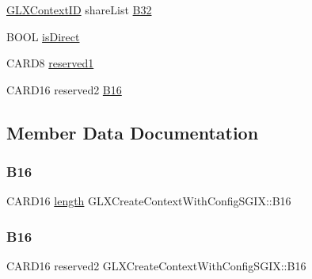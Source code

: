 \begin{DoxyCompactItemize}
\hyperlink{glx_8h_a17c7ca5b76cc448032df0b5352803005}{G\+L\+X\+Context\+ID} share\+List \hyperlink{struct_g_l_x_create_context_with_config_s_g_i_x_af0fcbeb86bc24147299afd5f8cff8a1e}{B32}
\item 
B\+O\+OL \hyperlink{struct_g_l_x_create_context_with_config_s_g_i_x_ad2f40ff51d1c93e9ebe639f0fafacc35}{is\+Direct}
\item 
C\+A\+R\+D8 \hyperlink{struct_g_l_x_create_context_with_config_s_g_i_x_a5755fef4598affef401c3cbdb6cdb61f}{reserved1}
\item 
C\+A\+R\+D16 reserved2 \hyperlink{struct_g_l_x_create_context_with_config_s_g_i_x_a51053982078569718d181578f06a57ba}{B16}
\end{DoxyCompactItemize}


\subsection{Member Data Documentation}
\mbox{\label{struct_g_l_x_create_context_with_config_s_g_i_x_affb394db800ab46e09ecf441f308f74d}} 
\subsubsection{\texorpdfstring{B16}{B16}\hspace{0.1cm}{\footnotesize\ttfamily [1/2]}}
{\footnotesize\ttfamily C\+A\+R\+D16 \hyperlink{glcorearb_8h_ab9c919755bde3b34349e23a32b4e0fa7}{length} G\+L\+X\+Create\+Context\+With\+Config\+S\+G\+I\+X\+::\+B16}

\mbox{\label{struct_g_l_x_create_context_with_config_s_g_i_x_a51053982078569718d181578f06a57ba}} 
\subsubsection{\texorpdfstring{B16}{B16}\hspace{0.1cm}{\footnotesize\ttfamily [2/2]}}
{\footnotesize\ttfamily C\+A\+R\+D16 reserved2 G\+L\+X\+Create\+Context\+With\+Config\+S\+G\+I\+X\+::\+B16}

